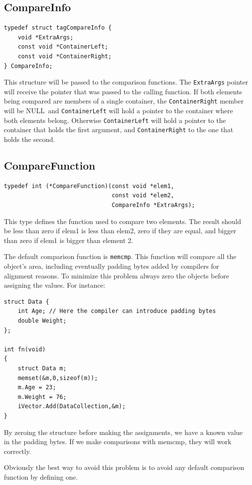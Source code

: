 \documentclass[12pt,a4paper]{memoir} %
\newif\iftth
\newcommand{\Null}{{\iftth \ NULL \else \footnotesize NULL\  \fi}}
\begin{document}
\subsection{CompareInfo}
\begin{verbatim}
typedef struct tagCompareInfo {
    void *ExtraArgs;
    const void *ContainerLeft;
    const void *ContainerRight;
} CompareInfo;
\end{verbatim}
This structure will be passed to the comparison functions. The \verb,ExtraArgs, pointer will receive the pointer that was passed to the calling function. If both elements being compared are members of a single container, the \texttt{ContainerRight} member will be \Null and \verb,ContainerLeft,
will hold a pointer to the container where both elements belong. Otherwise \verb,ContainerLeft, will hold a pointer to the container that holds
the first argument, and \verb,ContainerRight, to the one that holds the second. 

\subsection{CompareFunction}
\begin{verbatim}
typedef int (*CompareFunction)(const void *elem1, 
                               const void *elem2, 
                               CompareInfo *ExtraArgs);
\end{verbatim}
This type defines the function used to compare two elements.
The result should be less than zero if elem1 is less than elem2, zero if they are equal, and bigger than zero if elem1 is bigger than element 2.

The default comparison function is \texttt{memcmp}. This function will compare all the object's area, including eventually padding bytes added by
compilers for alignment reasons. To minimize this problem always zero the objects before assigning the values. For instance:
\begin{verbatim}
struct Data {
    int Age; // Here the compiler can introduce padding bytes
    double Weight;
};

int fn(void)
{
    struct Data m;
    memset(&m,0,sizeof(m));
    m.Age = 23;
    m.Weight = 76;
    iVector.Add(DataCollection,&m);
}
\end{verbatim}
By zeroing the structure before making the assignments, we have a known value in the padding bytes. If we make comparisons with memcmp, they will
work correctly.

Obviously the best way to avoid this problem is to avoid any default comparison function by defining one.
\end{document}
